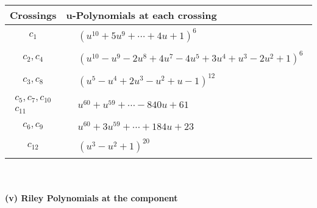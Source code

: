\documentclass[1p]{elsarticle_modified}
\theoremstyle{definition}
\begin{document}
\begin{tabular}{m{50pt}|m{274pt}}
Crossings & \hspace{64pt}u-Polynomials at each crossing \\
\hline $$\begin{aligned}c_{1}\end{aligned}$$&$\begin{aligned}
&(u^{10}+5 u^9+\cdots+4 u+1)^{6}
\end{aligned}$\\
\hline $$\begin{aligned}c_{2},c_{4}\end{aligned}$$&$\begin{aligned}
&(u^{10}- u^9-2 u^8+4 u^7-4 u^5+3 u^4+u^3-2 u^2+1)^6
\end{aligned}$\\
\hline $$\begin{aligned}c_{3},c_{8}\end{aligned}$$&$\begin{aligned}
&(u^5- u^4+2 u^3- u^2+u-1)^{12}
\end{aligned}$\\
\hline $$\begin{aligned}c_{5},c_{7},c_{10}\\c_{11}\end{aligned}$$&$\begin{aligned}
&u^{60}+u^{59}+\cdots-840 u+61
\end{aligned}$\\
\hline $$\begin{aligned}c_{6},c_{9}\end{aligned}$$&$\begin{aligned}
&u^{60}+3 u^{59}+\cdots+184 u+23
\end{aligned}$\\
\hline $$\begin{aligned}c_{12}\end{aligned}$$&$\begin{aligned}
&(u^3- u^2+1)^{20}
\end{aligned}$\\
\hline
\end{tabular}\\~\\
\newpage\renewcommand{\arraystretch}{1}
\flushleft \textbf{(v) Riley Polynomials at the component}\newline \\
\end{document}

